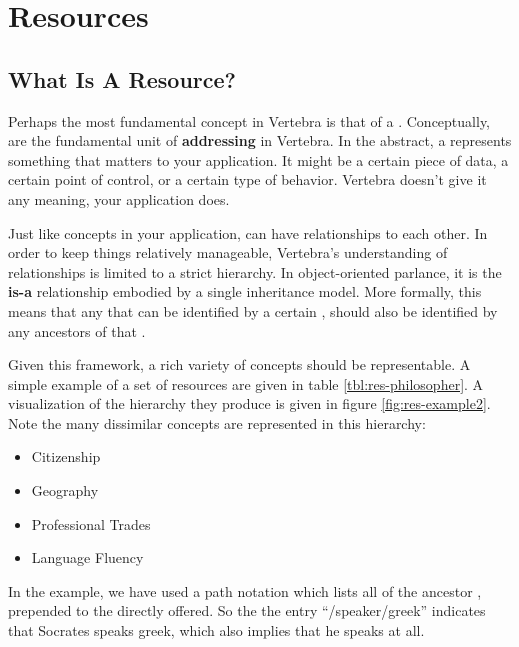 \section{Resources}


\subsection{What Is A Resource?}

\label{ref:define-resource}

Perhaps the most fundamental concept in Vertebra is that of a \resource{}.  Conceptually, \resources{} are the fundamental unit of \textbf{addressing} in Vertebra.  In the abstract, a \resource{} represents something that matters to your application.  It might be a certain piece of data, a certain point of control, or a certain type of behavior.  Vertebra doesn't give it any meaning, your application does.

Just like concepts in your application, \resources{} can have relationships to each other.  In order to keep things relatively manageable, Vertebra's understanding of relationships is limited to a strict hierarchy.  In object-oriented parlance, it is the {\bf is-a} relationship embodied by a single inheritance model.  More formally, this means that any \agent{} that can be identified by a certain \resource, should also be identified by any ancestors of that \resource{}.

Given this framework, a rich variety of concepts should be representable.  A simple example of a set of resources are given in table \ref{tbl:res-philosopher}.  A visualization of the hierarchy they produce is given in figure \ref{fig:res-example2}.  Note the many dissimilar concepts are represented in this \resource{} hierarchy:

\begin{itemize}
	\item Citizenship
	\item Geography
	\item Professional Trades
	\item Language Fluency
\end{itemize}

In the example, we have used a path notation which lists all of the ancestor \resources{}, prepended to the \resource{} directly offered.  So the the entry ``{\sf/speaker/greek}'' indicates that Socrates speaks greek, which also implies that he speaks at all.

